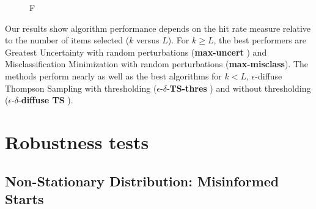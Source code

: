 \documentclass[nonblindrev]{informs3}
\newcommand{\alexander}[1]{\textcolor{blue}{\textbf{(alexander)} #1}}
\newcommand{\eric}[1]{\textcolor{red}{\textbf{(eric)} #1}}
\newcommand{\mismin}{\textbf{max-misclass}}
\newcommand{\edts}{$\epsilon$-$\delta$-\textbf{diffuse TS} }
\newcommand{\edtsthres}{$\epsilon$-$\delta$-\textbf{TS-thres} }
\newcommand{\uncert}{\textbf{max-uncert} }
\newcommand{\numperset}{L}
\begin{document}
\begin{figure}%
    \caption{F}%
    \label{fig:winapprox_thresh_hit20}%
 	\begin{center}
    \subfloat[Top 20]{}%
    \qquad
	\end{center}
\end{figure}


Our results show algorithm performance depends on the hit rate measure relative to the number of items selected ($k$ versus $\numperset$). For $k \ge L$, the best performers are Greatest Uncertainty with random perturbations (\uncert) and Misclassification Minimization with random perturbations (\mismin). The methods perform nearly as well as the best algorithms for $k < L$, $\epsilon$-diffuse Thompson Sampling with thresholding (\edtsthres) and without thresholding (\edts).




\section{Robustness tests} \label{sec:robust}


\subsection{Non-Stationary Distribution: Misinformed Starts}

\end{document}
